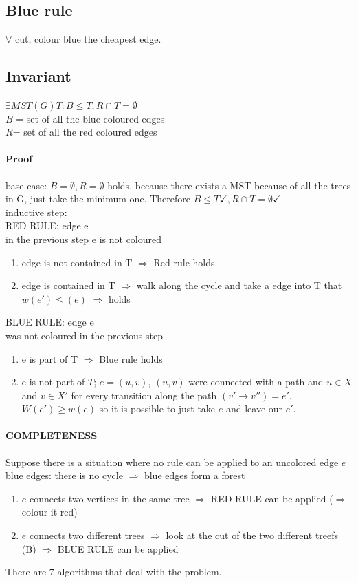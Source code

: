 \subsection{Blue rule}

$\forall$ cut, colour blue the cheapest edge.

\subsection{Invariant}
$\exists MST(G) T: B \leq T, R \cap T = \emptyset $ \\
$B$ = set of all the blue coloured edges \\
$R$= set of all the red coloured edges

\paragraph{Proof}
base case: $B = \emptyset, R = \emptyset$ holds, because there exists a MST because of all the trees in G, just take the minimum one. Therefore $B \leq T \checkmark, R \cap T = \emptyset \checkmark$ \\

inductive step: \\
RED RULE: edge e \\
in the previous step e is not coloured
\begin{enumerate}
\item edge is not contained in T $\Rightarrow$ Red rule holds
\item edge is contained in T $\Rightarrow$ walk along the cycle and take a edge into T that $w(e') \leq (e)$ $\Rightarrow$ holds
\end{enumerate}

BLUE RULE: edge e \\
was not coloured in the previous step
\begin{enumerate}
	\item e is part of T $\Rightarrow$ Blue rule holds
	\item  e is not part of $T$; $e = (u,v)$, $(u,v)$ were connected with a path and $u \in X$ and $v \in X'$ for every transition along the path $(v' \rightarrow v'') = e'$. $W(e') \geq w(e)$ so it is possible to just take $e$ and leave our $e'$.
\end{enumerate}


\paragraph{COMPLETENESS}
Suppose there is a situation where no rule can be applied to an uncolored edge $e$ \\
blue edges: there is no cycle $\Rightarrow$ blue edges form a forest
\begin{enumerate}
\item  $e$ connects two vertices in the same tree $\Rightarrow$ RED RULE can be applied ($\Rightarrow$ colour it red)
\item $e$ connects two different trees $\Rightarrow$ look at the cut of the two different treefs (B) $\Rightarrow$ BLUE RULE can be applied
\end{enumerate}
There are 7 algorithms that deal with the problem.

